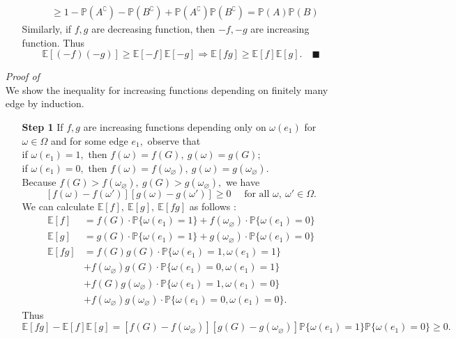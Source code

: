 \documentclass[12pt,a4paper]{report}
\theoremstyle{definition}
\begin{document}
\begin{enumerate}
\begin{enumerate}
\begin{align*}
        &\geq 1-\mathbb{P}(A^\complement)-\mathbb{P}(B^\complement)+\mathbb{P}(A^\complement)\mathbb{P}(B^\complement)=\mathbb{P}(A)\mathbb{P}(B)
    \end{align*}
    Similarly, if $f,g$ are decreasing function, then $-f, -g$ are increasing function. Thus 
    \[
    \mathbb{E}[(-f)(-g)]\geq \mathbb{E}[-f]\mathbb{E}[-g]\Rightarrow \mathbb{E}[fg]\geq \mathbb{E}[f]\mathbb{E}[g].\quad \blacksquare
    \]
    \end{enumerate}
    \item[\textit{Proof of}]\\[7pt]
    We show the inequality for increasing functions depending on finitely many edge by induction.
    \begin{enumerate}
        \item[\textbf{Step 1}] If $f,g$ are increasing functions depending only on $\omega(e_1)$ for $\omega\in \Omega$ and  for some edge $e_1,$ observe that \\
        if $\omega(e_1)=1,$ then $f(\omega)=f(G),\ g(\omega)=g(G);$ \\
        if $\omega(e_1)=0,$ then $f(\omega)=f(\omega_{\varnothing}),\ g(\omega)=g(\omega_{\varnothing}).$ \\
        Because $f(G)>f(\omega_{\varnothing}),\ g(G)>g(\omega_{\varnothing}),$ we have 
        \[
        [f(\omega)-f(\omega')][g(\omega)-g(\omega')]\geq 0\quad \mbox{ for all }\omega,\ \omega'\in \Omega.
        \]
        We can calculate $\mathbb{E}[f],\ \mathbb{E}[g],\ \mathbb{E}[fg]$ as follows : 
        \begin{align*}
        \mathbb{E}[f]&=f(G)\cdot \mathbb{P}\{\omega(e_1)=1\}+f(\omega_\varnothing)\cdot \mathbb{P}\{\omega(e_1)=0\}\\
        \mathbb{E}[g]&=g(G)\cdot \mathbb{P}\{\omega(e_1)=1\}+g(\omega_\varnothing)\cdot \mathbb{P}\{\omega(e_1)=0\}\\
        \mathbb{E}[fg]&=f(G)g(G)\cdot \mathbb{P}\{\omega(e_1)=1,\omega(e_1)=1\}\\
        &+f(\omega_\varnothing)g(G)\cdot \mathbb{P}\{\omega(e_1)=0,\omega(e_1)=1\}\\
        &+f(G)g(\omega_\varnothing)\cdot \mathbb{P}\{\omega(e_1)=1,\omega(e_1)=0\}\\
        &+f(\omega_\varnothing)g(\omega_\varnothing)\cdot \mathbb{P}\{\omega(e_1)=0,\omega(e_1)=0\}.
        \end{align*}
        Thus
        \[
        \mathbb{E}[fg]-\mathbb{E}[f]\mathbb{E}[g]=[f(G)-f(\omega_\varnothing)][g(G)-g(\omega_\varnothing)]\mathbb{P}\{\omega(e_1)=1\}\mathbb{P}\{\omega(e_1)=0\}\geq 0.
\]
\end{enumerate}
\end{enumerate}
\end{document}
